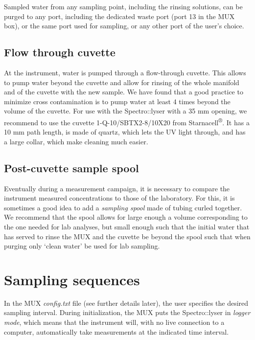 \documentclass[]{book}
\begin{document}
Sampled water from any sampling point, including the rinsing solutions, can be purged to any port, including the dedicated waste port (port 13 in the MUX box), or the same port used for sampling, or any other port of the user's choice.

\hypertarget{flow-through-cuvette}{%
\subsection{Flow through cuvette}\label{flow-through-cuvette}}

At the instrument, water is pumped through a flow-through cuvette. This allows to pump water beyond the cuvette and allow for rinsing of the whole manifold and of the cuvette with the new sample. We have found that a good practice to minimize cross contamination is to pump water at least 4 times beyond the volume of the cuvette. For use with the Spectro::lyser with a 35 mm opening, we recommend to use the cuvette 1-Q-10/SBTX2-8/10X20 from Starnacell\textsuperscript{®}. It has a 10 mm path length, is made of quartz, which lets the UV light through, and has a large collar, which make cleaning much easier.

\hypertarget{post-cuvette-sample-spool}{%
\subsection{Post-cuvette sample spool}\label{post-cuvette-sample-spool}}

Eventually during a measurement campaign, it is necessary to compare the instrument measured concentrations to those of the laboratory. For this, it is sometimes a good idea to add a \emph{sampling spool} made of tubing curled together. We recommend that the spool allows for large enough a volume corresponding to the one needed for lab analyses, but small enough such that the initial water that has served to rinse the MUX and the cuvette be beyond the spool such that when purging only `clean water' be used for lab sampling.

\hypertarget{sampling-sequences}{%
\section{Sampling sequences}\label{sampling-sequences}}

In the MUX \emph{config.txt} file (see further details later), the user specifies the desired sampling interval. During initialization, the MUX puts the Spectro::lyser in \emph{logger mode}, which means that the instrument will, with no live connection to a computer, automatically take measurements at the indicated time interval.
\end{document}
